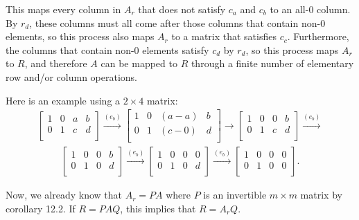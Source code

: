 \documentclass[12pt]{article}
\begin{document}
\begin{enumerate}
    This maps every column in $A_r$ that does not satisfy $c_a$
    and $c_b$ to an all-0 column. By $r_d$, these columns must
    all come after those columns that contain non-0 elements, so
    this process also maps $A_r$ to a matrix that satisfies
    $c_c$. Furthermore, the columns that contain non-0 elements
    satisfy $c_d$ by $r_d$, so this process maps $A_r$ to $R$,
    and therefore $A$ can be mapped to $R$ through a finite
    number of elementary row and/or column operations.

    Here is an example using a $2 \times 4$ matrix:
    \begin{align*}
      \begin{bmatrix}
        1 & 0 & a & b\\
        0 & 1 & c & d\\
      \end{bmatrix}
      \xrightarrow{(e_b)}
      \begin{bmatrix}
        1 & 0 & (a - a) & b\\
        0 & 1 & (c - 0) & d\\
      \end{bmatrix}
      \xrightarrow{}
      \begin{bmatrix}
        1 & 0 & 0 & b\\
        0 & 1 & c & d\\
      \end{bmatrix}
      \xrightarrow{(e_b)}
    \end{align*}
    \begin{align*}
      \begin{bmatrix}
        1 & 0 & 0 & b\\
        0 & 1 & 0 & d\\
      \end{bmatrix}
      \xrightarrow{(e_b)}
      \begin{bmatrix}
        1 & 0 & 0 & 0\\
        0 & 1 & 0 & d\\
      \end{bmatrix}
      \xrightarrow{(e_b)}
      \begin{bmatrix}
        1 & 0 & 0 & 0\\
        0 & 1 & 0 & 0\\
      \end{bmatrix}.
    \end{align*}

    Now, we already know that $A_r = PA$ where $P$ is an
    invertible $m \times m$ matrix by corollary 12.2. If $R =
    PAQ$, this implies that $R = A_rQ$.


\end{enumerate}
\end{document}
